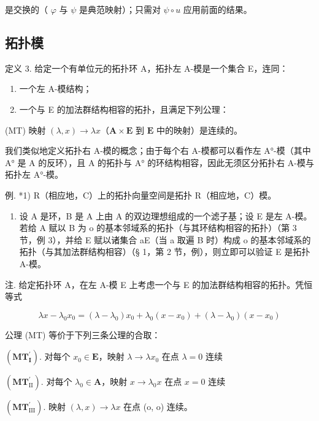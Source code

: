 是交换的（ \(\varphi\) 与 \(\psi\) 是典范映射）；只需对 \(\psi \circ u\) 应用前面的结果。

\subsection{拓扑模}

定义 3. 给定一个有单位元的拓扑环 A，拓扑左 A-模是一个集合 E，连同：

\begin{enumerate}
\def\labelenumi{\arabic{enumi})}
\item
  一个左 A-模结构；
\item
  一个与 E 的加法群结构相容的拓扑，且满足下列公理：
\end{enumerate}

(MT) 映射 \((\lambda, x) \to \lambda x\)（\(\mathbf{A} \times \mathbf{E}\) 到 \(\mathbf{E}\) 中的映射）是连续的。

我们类似地定义拓扑右 A-模的概念；由于每个右 A-模都可以看作左 A°-模（其中 A° 是 A 的反环），且 A 的拓扑与 A° 的环结构相容，因此无须区分拓扑右 A-模与拓扑左 A°-模。

例. *1) R（相应地，C）上的拓扑向量空间是拓扑 R（相应地，C）模。

\begin{enumerate}
\def\labelenumi{\arabic{enumi})}
\setcounter{enumi}{1}
\tightlist
\item
  设 A 是环，B 是 A 上由 A 的双边理想组成的一个滤子基；设 E 是左 A-模。若给 A 赋以 B 为 o 的基本邻域系的拓扑（与其环结构相容的拓扑）（第 3 节，例 3），并给 E 赋以诸集合 aE（当 a 取遍 B 时）构成 o 的基本邻域系的拓扑（与其加法群结构相容）（§ 1，第 2 节，例），则立即可以验证 E 是拓扑 A-模。
\end{enumerate}

注. 给定拓扑环 A，在左 A-模 E 上考虑一个与 E 的加法群结构相容的拓扑。凭恒等式

\[
\lambda x - \lambda_ {0} x _ {0} = (\lambda - \lambda_ {0}) x _ {0} + \lambda_ {0} (x - x _ {0}) + (\lambda - \lambda_ {0}) (x - x _ {0})
\]

公理 (MT) 等价于下列三条公理的合取：

\((\mathbf{MT}_{\mathbf{I}}^{\prime})\). 对每个 \(x_0\in \mathbf{E}\)，映射 \(\lambda \to \lambda x_0\) 在点 \(\lambda = 0\) 连续

\((\mathbf{MT}_{\mathrm{II}}^{\prime})\). 对每个 \(\lambda_0\in \mathbf{A}\)，映射 \(x\to \lambda_0x\) 在点 \(x = 0\) 连续

\((\mathbf{MT}_{\mathrm{III}}^{\prime})\). 映射 \((\lambda ,x)\to \lambda x\) 在点 (o, o) 连续。

